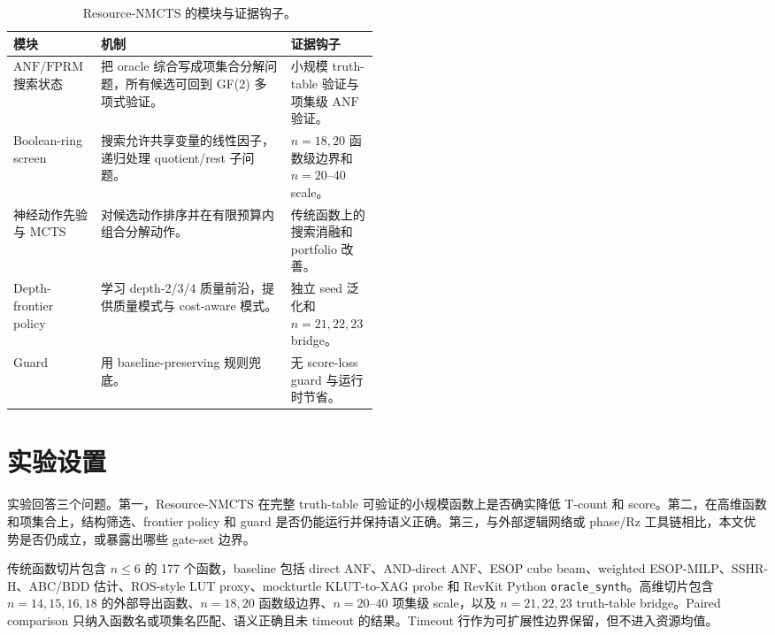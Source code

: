 \documentclass[UTF8,fontset=macnew,11pt]{ctexart}
\newcommand{\method}{Resource-NMCTS}
\newcommand{\anf}{\ensuremath{\mathrm{ANF}}}
\newcommand{\fprm}{\ensuremath{\mathrm{FPRM}}}
\newcommand{\mcts}{\ensuremath{\mathrm{MCTS}}}
\newcommand{\ttable}{truth-table}
\begin{document}
\begin{table}[H]
\centering
\small
\caption{\method{} 的模块与证据钩子。}
\label{tab:modules}
\begin{tabularx}{\linewidth}{>{\raggedright\arraybackslash}p{0.24\linewidth}>{\raggedright\arraybackslash}X>{\raggedright\arraybackslash}p{0.24\linewidth}}
\toprule
模块 & 机制 & 证据钩子 \\
\midrule
\anf{}/\fprm{} 搜索状态 & 把 oracle 综合写成项集合分解问题，所有候选可回到 GF(2) 多项式验证。 & 小规模 \ttable{} 验证与项集级 \anf{} 验证。 \\
Boolean-ring screen & 搜索允许共享变量的线性因子，递归处理 quotient/rest 子问题。 & $n=18,20$ 函数级边界和 $n=20$--$40$ scale。 \\
神经动作先验与 \mcts{} & 对候选动作排序并在有限预算内组合分解动作。 & 传统函数上的搜索消融和 portfolio 改善。 \\
Depth-frontier policy & 学习 depth-2/3/4 质量前沿，提供质量模式与 cost-aware 模式。 & 独立 seed 泛化和 $n=21,22,23$ bridge。 \\
Guard & 用 baseline-preserving 规则兜底。 & 无 score-loss guard 与运行时节省。 \\
\bottomrule
\end{tabularx}
\end{table}

\section{实验设置}

实验回答三个问题。第一，\method{} 在完整 truth-table 可验证的小规模函数上是否确实降低 T-count 和 score。第二，在高维函数和项集合上，结构筛选、frontier policy 和 guard 是否仍能运行并保持语义正确。第三，与外部逻辑网络或 phase/Rz 工具链相比，本文优势是否仍成立，或暴露出哪些 gate-set 边界。

传统函数切片包含 $n\leq6$ 的 177 个函数，baseline 包括 direct \anf{}、AND-direct \anf{}、ESOP cube beam、weighted ESOP-MILP、SSHR-H、ABC/BDD 估计、ROS-style LUT proxy、mockturtle KLUT-to-XAG probe 和 RevKit Python \texttt{oracle\_synth}。高维切片包含 $n=14,15,16,18$ 的外部导出函数、$n=18,20$ 函数级边界、$n=20$--$40$ 项集级 scale，以及 $n=21,22,23$ truth-table bridge。Paired comparison 只纳入函数名或项集名匹配、语义正确且未 timeout 的结果。Timeout 行作为可扩展性边界保留，但不进入资源均值。
\end{document}
